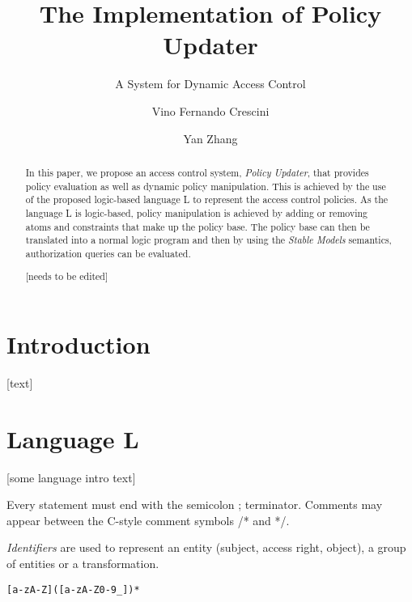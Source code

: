 \documentclass{llncs}
\begin{document}
  \long{}

  \title{The Implementation of Policy Updater}
  \subtitle{A System for Dynamic Access Control}

  \author{Vino Fernando Crescini \and Yan Zhang}


  \maketitle

  \begin{abstract}
    In this paper, we propose an access control system, \emph{Policy Updater},
    that provides policy evaluation as well as dynamic policy manipulation.
    This is achieved by the use of the proposed logic-based language L to
    represent the access control policies. As the language L is logic-based,
    policy manipulation is achieved by adding or removing atoms and constraints
    that make up the policy base. The policy base can then be translated into a
    normal logic program and then by using the \emph{Stable Models} semantics,
    authorization queries can be evaluated.

    [needs to be edited]
  \end{abstract}

  \section{Introduction}
    [text]

  \section{Language L}

    [some language intro text]

    Every statement must end with the semicolon ; terminator. Comments
    may appear between the C-style comment symbols /* and */.

    \emph{Identifiers} are used to represent an entity (subject, access
    right, object), a group of entities or a transformation.

    \begin{verbatim}[a-zA-Z]([a-zA-Z0-9_])*\end{verbatim}
\end{document}
